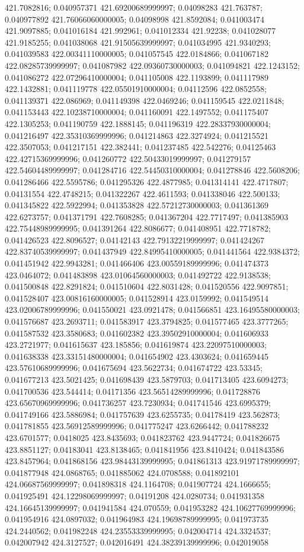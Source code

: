 421.7082816; 0.040957371 421.69200689999997; 0.04098283 421.763787; 0.040977892 421.76066060000005; 0.04098998 421.8592084; 0.041003474 421.9097885; 0.041016184 421.992961; 0.041012334 421.92238; 0.041028077 421.9185255; 0.041038068 421.91505639999997; 0.041034995 421.9340293; 0.041039583 422.00341110000005; 0.041057545 422.0184866; 0.041067182 422.08285739999997; 0.041087982 422.09360730000003; 0.041094821 422.1243152; 0.041086272 422.07296410000004; 0.041105008 422.1193899; 0.041117989 422.1432881; 0.041119778 422.05501910000004; 0.04112596 422.0852558; 0.041139371 422.086969; 0.041149398 422.0469246; 0.041159545 422.0211848; 0.041153443 422.10238710000004; 0.041160091 422.1497552; 0.041175407 422.1305253; 0.041190759 422.1888145; 0.041196319 422.28337930000004; 0.041216497 422.35310369999996; 0.041214863 422.3274924; 0.041215521 422.3507053; 0.041217151 422.382441; 0.041237485 422.542276; 0.04125463 422.42715369999996; 0.041260772 422.50433019999997; 0.041279157 422.54604489999997; 0.041284716 422.54450310000004; 0.041278846 422.5608206; 0.041286466 422.5595786; 0.041295326 422.4877985; 0.041314141 422.4717807; 0.04131554 422.4748215; 0.041322267 422.4611593; 0.041338046 422.500133; 0.041345822 422.5922994; 0.041353828 422.57212730000003; 0.041361369 422.6273757; 0.041371791 422.7608285; 0.041367204 422.7717497; 0.041385903 422.75448989999995; 0.041391264 422.8086677; 0.041408951 422.7718782; 0.041426523 422.8096527; 0.04142143 422.79132219999997; 0.041424267 422.83740539999997; 0.041437949 422.84995410000005; 0.041441564 422.9384372; 0.041451942 422.9943281; 0.041466406 423.00559189999996; 0.041474373 423.0464072; 0.041483898 423.01064560000003; 0.041492722 422.9138538; 0.041500848 422.8291824; 0.041510604 422.8031428; 0.041520556 422.9097851; 0.041528407 423.00816160000005; 0.041528914 423.0159992; 0.041549514 423.02006789999996; 0.041550021 423.0921478; 0.041566851 423.16495580000003; 0.041576687 423.2693711; 0.041583917 423.3794825; 0.041577465 423.3777265; 0.041587532 423.3580683; 0.041602382 423.39502910000004; 0.041606933 423.2721977; 0.041615637 423.185856; 0.041619874 423.22097510000003; 0.041638338 423.33151480000004; 0.041654902 423.4303624; 0.041659445 423.57610689999996; 0.041675694 423.5622734; 0.041674722 423.53345; 0.041677213 423.5021425; 0.041698439 423.5879703; 0.041713405 423.6094273; 0.041700536 423.544414; 0.04171356 423.56514289999996; 0.041728876 423.65670969999996; 0.041736257 423.7230934; 0.041741546 423.6995379; 0.041749166 423.5886984; 0.041757639 423.6255735; 0.04178419 423.562873; 0.041781855 423.56912589999996; 0.041775247 423.6266442; 0.041788232 423.6701577; 0.0418025 423.8435693; 0.041823762 423.9447724; 0.041826675 423.8851127; 0.04183041 423.8138465; 0.041841956 423.8410424; 0.041843586 423.8457964; 0.041868156 423.98443139999995; 0.041861313 423.91971789999997; 0.041877948 424.0868765; 0.041885062 424.0708588; 0.041892101 424.06687569999997; 0.041898318 424.1164708; 0.041907724 424.1666655; 0.041925491 424.12298069999997; 0.04191208 424.0280734; 0.041931358 424.16645139999997; 0.041941584 424.070559; 0.041953282 424.10627769999996; 0.041954916 424.0897032; 0.041964983 424.19698789999995; 0.041973735 424.2440562; 0.041982248 424.23553339999995; 0.042004714 424.3324537; 0.042007942 424.3127527; 0.042016491 424.38239139999996; 0.042019058 